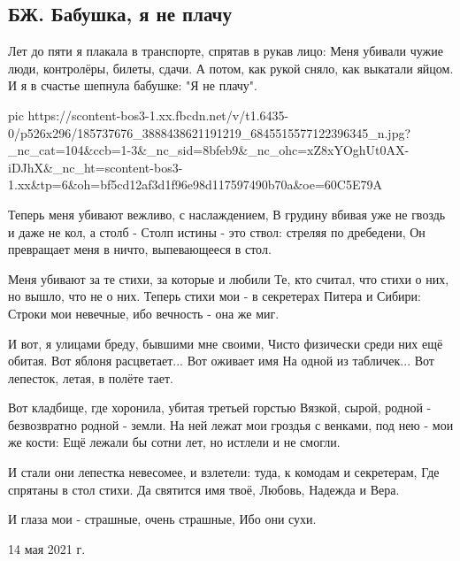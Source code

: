  
 
 
 
 

\subsection{БЖ. Бабушка, я не плачу}

Лет до пяти я плакала в транспорте, спрятав в рукав лицо:
Меня убивали чужие люди, контролёры, билеты, сдачи.
А потом, как рукой сняло, как выкатали яйцом.
И я в счастье шепнула бабушке: 
"Я не плачу".

\ifcmt
  pic https://scontent-bos3-1.xx.fbcdn.net/v/t1.6435-0/p526x296/185737676_3888438621191219_6845515577122396345_n.jpg?_nc_cat=104&ccb=1-3&_nc_sid=8bfeb9&_nc_ohc=xZ8xYOghUt0AX-iDJhX&_nc_ht=scontent-bos3-1.xx&tp=6&oh=bf5cd12af3d1f96e98d117597490b70a&oe=60C5E79A
\fi

Теперь меня убивают вежливо, с наслаждением,
В грудину вбивая уже не гвоздь и даже не кол, а столб -
Столп истины - это ствол: стреляя по дребедени,
Он превращает меня в ничто, выпевающееся в стол.

Меня убивают за те стихи, за которые и любили
Те, кто считал, что стихи о них, но вышло, что не о них.
Теперь стихи мои - в секретерах Питера и Сибири:
Строки мои невечные, ибо вечность - она же миг.

И вот, я улицами бреду, бывшими мне своими,
Чисто физически среди них ещё обитая.
Вот яблоня расцветает... Вот оживает имя
На одной из табличек... Вот лепесток, летая, в полёте тает.

Вот кладбище, где хоронила, убитая третьей горстью
Вязкой, сырой, родной - безвозвратно родной - земли.
На ней лежат мои гроздья с венками, под нею - мои же кости:
Ещё лежали бы сотни лет, но истлели и не смогли.

И стали они лепестка невесомее, и взлетели: туда, к комодам и секретерам, 
Где спрятаны в стол стихи.
Да святится имя твоё, Любовь, Надежда и Вера.

И глаза мои - страшные, очень страшные,
Ибо они сухи.

14 мая 2021 г.
